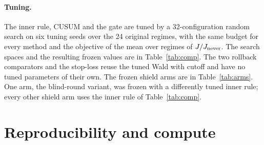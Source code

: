 \documentclass[10pt]{article}
\theoremstyle{plain}
\theoremstyle{definition}
\begin{document}
\paragraph{Tuning.}
The inner rule, CUSUM and the gate are tuned by a 32-configuration random search on six tuning seeds over the 24 original regimes, with the same budget for every method and the objective of the mean over regimes of $J/J_{\rm never}$. The search spaces and the resulting frozen values are in Table~\ref{tab:comp}. The two rollback comparators and the stop-loss reuse the tuned Wald with cutoff and have no tuned parameters of their own. The frozen shield arms are in Table~\ref{tab:arms}. One arm, the blind-round variant, was frozen with a differently tuned inner rule; every other shield arm uses the inner rule of Table~\ref{tab:comp}.

\begin{table}[!htbp]
\caption{Comparators: label, frozen parameters (from \texttt{f3\_confirmation\_arms\_v1.json}) and search space. Cutoff fractions are multiples of $T$. $\lambda$ is the Wald discount, $\gamma$ its level, $\delta,h$ the CUSUM drift and threshold, $\alpha,\lambda_g$ the gate level and bet size.}\label{tab:comp}
\centering\scriptsize

\end{table}

\begin{table}[!htbp]
\caption{Shield arms as frozen, with the inner rule each wraps. The label reserve is a fraction of $B$.}\label{tab:arms}
\centering\scriptsize

\end{table}

\section{Reproducibility and compute}\label{app:repro}
\end{document}
